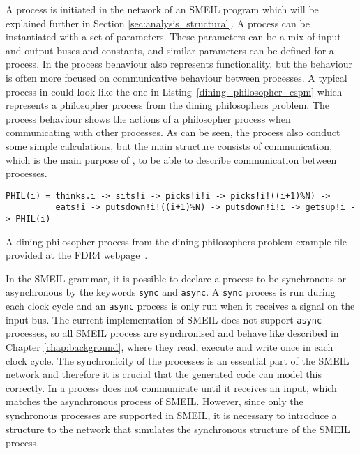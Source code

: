 A process is initiated in the network of an SMEIL program which will be explained further in Section \ref{sec:analysis_structural}. A process can be instantiated with a set of parameters. These parameters can be a mix of input and output buses and constants, and similar parameters can be defined for a \cspm{} process. In \cspm{} the process behaviour also represents functionality, but the behaviour is often more focused on communicative behaviour between processes.
A typical process in \cspm{} could look like the one in Listing~\ref{dining_philosopher_cspm} which represents a philosopher process from the dining philosophers problem. The process behaviour shows the actions of a philosopher process when communicating with other processes. As can be seen, the process also conduct some simple calculations, but the main structure consists of communication, which is the main purpose of \cspm{}, to be able to describe communication between processes.
\begin{listing}
\begin{verbatim}
PHIL(i) = thinks.i -> sits!i -> picks!i!i -> picks!i!((i+1)%N) ->
          eats!i -> putsdown!i!((i+1)%N) -> putsdown!i!i -> getsup!i -> PHIL(i)

\end{verbatim}
\caption{A dining philosopher process from the dining philosophers problem example file provided at the FDR4 webpage~\cite{fdr_example}.}
\label{dining_philosopher_cspm}
\end{listing}

In the SMEIL grammar, it is possible to declare a process to be synchronous or asynchronous by the keywords \texttt{sync} and \texttt{async}. A \texttt{sync} process is run during each clock cycle and an \texttt{async} process is only run when it receives a signal on the input bus. The current implementation of SMEIL does not support \texttt{async} processes, so all SMEIL process are synchronised and behave like described in Chapter \ref{chap:background}, where they read, execute and write once in each clock cycle. The synchronicity of the processes is an essential part of the SMEIL network and therefore it is crucial that the generated code can model this correctly. In \cspm{} a process does not communicate until it receives an input, which matches the asynchronous process of SMEIL. However, since only the synchronous processes are supported in SMEIL, it is necessary to introduce a structure to the \cspm{} network that simulates the synchronous structure of the SMEIL process.\\

